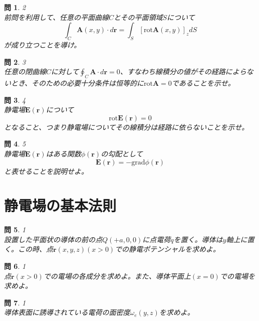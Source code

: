 \documentclass{jsarticle}
\newtheorem{pro}{問}[section]
\begin{document}
\begin{pro}2\\
前問を利用して、任意の平面曲線\(C\)とその平面領域\(S\)について
\[\int_{C}\bm{A}(x,y)\cdot d\bm{r}=\int_{S}\left[\mathrm{rot}\bm{A}(x,y)\right]_{z}dS\]
が成り立つことを導け。
\end{pro}

\begin{pro}3\\
任意の閉曲線\(C\)に対して\(\displaystyle\oint_{C}\bm{A}\cdot d\bm{r}=0\)、すなわち線積分の値がその経路によらないとき、そのための必要十分条件は恒等的に\(\mathrm{rot}\bm{A}=0\)であることを示せ。
\end{pro}

\begin{pro}4\\
静電場\(\bm{E}(\bm{r})\)について
\[\mathrm{rot}\bm{E}(\bm{r})=0\]
となること、つまり静電場についてその線積分は経路に依らないことを示せ。
\end{pro}

\begin{pro}5\\
静電場\(\bm{E}(\bm{r})\)はある関数\(\phi(\bm{r})\)の勾配として
\[\bm{E}(\bm{r})=-\mathrm{grad}\phi(\bm{r})\]
と表せることを説明せよ。
\end{pro}







\section{静電場の基本法則}
\noindent


\begin{pro}1\\
設置した平面状の導体の前の点\(Q(+a,0,0)\)に点電荷\(q\)を置く。導体は\(y\)軸上に置く。この時、点\(\bm{r}(x,y,z)(x>0)\)での静電ポテンシャルを求めよ。
\end{pro}

\begin{pro}1\\
点\(\bm{r}(x>0)\)での電場の各成分を求めよ。また、導体平面上\((x=0)\)での電場を求めよ。
\end{pro}

\begin{pro}1\\
導体表面に誘導されている電荷の面密度\(\omega_{e}(y,z)\)を求めよ。
\end{pro}
\end{document}
